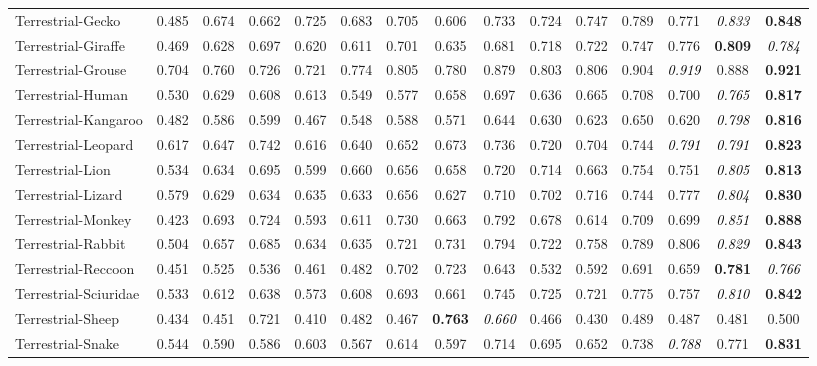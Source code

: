 \documentclass[10pt,journal,compsoc]{IEEEtran}
\newcommand{\Rev}[1]{\textcolor{black}{#1}}
\begin{document}
\begin{table*}[thp!]
\begin{tabular}{l | ccccc ccccc cccc}
Terrestrial-Gecko &0.485 &0.674 &0.662 &0.725 &0.683 &0.705 &0.606 &0.733 &0.724 &0.747 &0.789 &0.771 & \Rev{\textit{0.833}} &\textbf{0.848}\\
\rowcolor{mygray}
Terrestrial-Giraffe &0.469 &0.628 &0.697 &0.620 &0.611 &0.701 &0.635 &0.681 &0.718 &0.722 &0.747 &0.776 &\textbf{0.809} & \Rev{\textit{0.784}}\\
Terrestrial-Grouse &0.704 &0.760 &0.726 &0.721 &0.774 &0.805 &0.780 &0.879 &0.803 &0.806 &0.904 & \Rev{\textit{0.919}} &0.888 &\textbf{0.921}\\
\rowcolor{mygray}
Terrestrial-Human &0.530 &0.629 &0.608 &0.613 &0.549 &0.577 &0.658 &0.697 &0.636 &0.665 &0.708 &0.700 & \Rev{\textit{0.765}} &\textbf{0.817}\\
Terrestrial-Kangaroo &0.482 &0.586 &0.599 &0.467 &0.548 &0.588 &0.571 &0.644 &0.630 &0.623 &0.650 &0.620 & \Rev{\textit{0.798}} &\textbf{0.816}\\
\rowcolor{mygray}
Terrestrial-Leopard &0.617 &0.647 &0.742 &0.616 &0.640 &0.652 &0.673 &0.736 &0.720 &0.704 &0.744 & \Rev{\textit{0.791}} & \Rev{\textit{0.791}} &\textbf{0.823}\\
Terrestrial-Lion &0.534 &0.634 &0.695 &0.599 &0.660 &0.656 &0.658 &0.720 &0.714 &0.663 &0.754 &0.751 & \Rev{\textit{0.805}} &\textbf{0.813}\\
\rowcolor{mygray}
Terrestrial-Lizard &0.579 &0.629 &0.634 &0.635 &0.633 &0.656 &0.627 &0.710 &0.702 &0.716 &0.744 &0.777 & \Rev{\textit{0.804}} &\textbf{0.830}\\
Terrestrial-Monkey &0.423 &0.693 &0.724 &0.593 &0.611 &0.730 &0.663 &0.792 &0.678 &0.614 &0.709 &0.699 & \Rev{\textit{0.851}} &\textbf{0.888}\\
\rowcolor{mygray}
Terrestrial-Rabbit &0.504 &0.657 &0.685 &0.634 &0.635 &0.721 &0.731 &0.794 &0.722 &0.758 &0.789 &0.806 & \Rev{\textit{0.829}} &\textbf{0.843}\\
Terrestrial-Reccoon &0.451 &0.525 &0.536 &0.461 &0.482 &0.702 &0.723 &0.643 &0.532 &0.592 &0.691 &0.659 &\textbf{0.781} & \Rev{\textit{0.766}}\\
\rowcolor{mygray}
Terrestrial-Sciuridae &0.533 &0.612 &0.638 &0.573 &0.608 &0.693 &0.661 &0.745 &0.725 &0.721 &0.775 &0.757 & \Rev{\textit{0.810}} &\textbf{0.842}\\
Terrestrial-Sheep &0.434 &0.451 &0.721 &0.410 &0.482 &0.467 &\textbf{0.763} & \Rev{\textit{0.660}} &0.466 &0.430 &0.489 &0.487 &0.481 &0.500\\
\rowcolor{mygray}
Terrestrial-Snake &0.544 &0.590 &0.586 &0.603 &0.567 &0.614 &0.597 &0.714 &0.695 &0.652 &0.738 & \Rev{\textit{0.788}} &0.771 &\textbf{0.831}\\

\end{tabular}
\end{table*}
\end{document}
